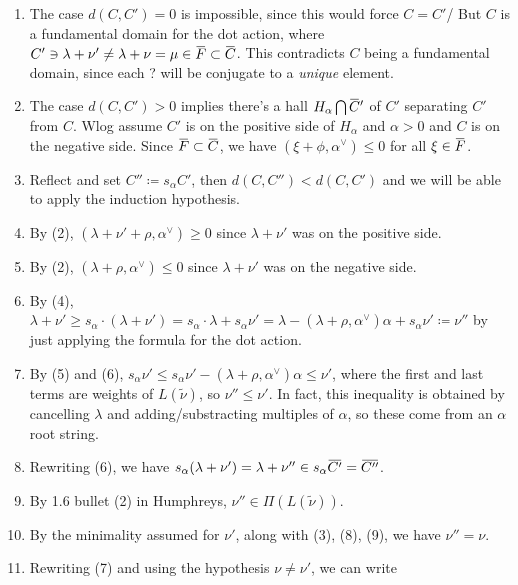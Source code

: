 \documentclass[11pt]{scrartcl}
\theoremstyle{definition}
\theoremstyle{theorem}
\theoremstyle{proof}
\newenvironment{proof}
{\pushQED{$\qed$}\pf}
{\par\popQED\endpf}
\theoremstyle{definition}
\theoremstyle{break}
\theoremstyle{problem}
\providecommand{\tightlist}{%
  \setlength{\itemsep}{0pt}\setlength{\parskip}{0pt}}
\newcommand{\definedas}[0]{\coloneqq}
\newcommand{\dual}[0]{^\vee}
\newcommand{\intersect}[0]{\bigcap}
\renewcommand{\bar}[1]{\mkern 1.5mu\overline{\mkern-1.5mu#1\mkern-1.5mu}\mkern 1.5mu}
\renewcommand{\qed}[0]{\hfill\blacksquare}
\begin{document}
\begin{proof}
\begin{enumerate}
\def\labelenumi{\arabic{enumi}.}
\tightlist
\item
  The case \(d(C, C') = 0\) is impossible, since this would force
  \(C =C'\)/ But \(C\) is a fundamental domain for the dot action, where
  \(C' \ni \lambda + \nu' \neq \lambda + \nu = \mu \in \bar F \subset \bar C\).
  This contradicts \(C\) being a fundamental domain, since each ? will
  be conjugate to a \emph{unique} element.
\item
  The case \(d(C, C') > 0\) implies there's a hall
  \(H_\alpha \intersect \bar C '\) of \(C'\) separating \(C'\) from
  \(C\). Wlog assume \(C'\) is on the positive side of \(H_\alpha\) and
  \(\alpha > 0\) and \(C\) is on the negative side. Since
  \(\bar F \subset \bar C\), we have
  \((\xi + \phi, \alpha\dual) \leq 0\) for all \(\xi \in \bar F\).
\item
  Reflect and set \(C'' \definedas s_\alpha C'\), then
  \(d(C, C'') < d(C, C')\) and we will be able to apply the induction
  hypothesis.
\item
  By (2), \((\lambda + \nu' + \rho, \alpha\dual) \geq 0\) since
  \(\lambda + \nu'\) was on the positive side.
\item
  By (2), \((\lambda + \rho, \alpha\dual) \leq 0\) since
  \(\lambda + \nu'\) was on the negative side.
\item
  By (4),
  \(\lambda + \nu' \geq s_\alpha \cdot (\lambda + \nu') = s_\alpha \cdot \lambda + s_\alpha \nu' = \lambda - (\lambda + \rho, \alpha\dual)\alpha + s_\alpha \nu' \definedas \nu''\)
  by just applying the formula for the dot action.
\item
  By (5) and (6),
  \(s_\alpha \nu' \leq s_\alpha \nu' - (\lambda + \rho, \alpha\dual) \alpha \leq \nu'\),
  where the first and last terms are weights of \(L(\tilde \nu)\), so
  \(\nu'' \leq \nu'\). In fact, this inequality is obtained by
  cancelling \(\lambda\) and adding/substracting multiples of
  \(\alpha\), so these come from an \(\alpha\) root string.
\item
  Rewriting (6), we have
  \(s_\alpha (\lambda + \nu') = \lambda + \nu'' \in s_\alpha \bar {C'} = \bar {C''}\).
\item
  By 1.6 bullet (2) in Humphreys, \(\nu'' \in \Pi (L(\tilde \nu))\).
\item
  By the minimality assumed for \(\nu'\), along with (3), (8), (9), we
  have \(\nu'' = \nu\).
\item
  Rewriting (7) and using the hypothesis \(\nu \neq \nu'\), we can write

\end{enumerate}
\end{proof}
\end{document}
